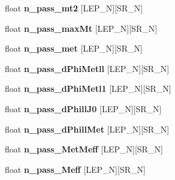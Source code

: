 \begin{DoxyCompactItemize}
\item 
\hypertarget{classSusySelection_a400a58bfcd54229a33eb69550d9debf9}{
float {\bfseries n\_\-pass\_\-mt2} \mbox{[}LEP\_\-N\mbox{]}\mbox{[}SR\_\-N\mbox{]}}
\label{classSusySelection_a400a58bfcd54229a33eb69550d9debf9}

\item 
\hypertarget{classSusySelection_a6504208015648870d347835d5add6fb4}{
float {\bfseries n\_\-pass\_\-maxMt} \mbox{[}LEP\_\-N\mbox{]}\mbox{[}SR\_\-N\mbox{]}}
\label{classSusySelection_a6504208015648870d347835d5add6fb4}

\item 
\hypertarget{classSusySelection_af8f3dc927ff7f296d4abfcc2016b217b}{
float {\bfseries n\_\-pass\_\-met} \mbox{[}LEP\_\-N\mbox{]}\mbox{[}SR\_\-N\mbox{]}}
\label{classSusySelection_af8f3dc927ff7f296d4abfcc2016b217b}

\item 
\hypertarget{classSusySelection_a4412ba67d89cdf7b6bf6602a34954bdb}{
float {\bfseries n\_\-pass\_\-dPhiMetll} \mbox{[}LEP\_\-N\mbox{]}\mbox{[}SR\_\-N\mbox{]}}
\label{classSusySelection_a4412ba67d89cdf7b6bf6602a34954bdb}

\item 
\hypertarget{classSusySelection_afa453d5b782b99bf096735218c96f830}{
float {\bfseries n\_\-pass\_\-dPhiMetl1} \mbox{[}LEP\_\-N\mbox{]}\mbox{[}SR\_\-N\mbox{]}}
\label{classSusySelection_afa453d5b782b99bf096735218c96f830}

\item 
\hypertarget{classSusySelection_a4c1e14157ae7a7dae1cffa41583e3ff0}{
float {\bfseries n\_\-pass\_\-dPhillJ0} \mbox{[}LEP\_\-N\mbox{]}\mbox{[}SR\_\-N\mbox{]}}
\label{classSusySelection_a4c1e14157ae7a7dae1cffa41583e3ff0}

\item 
\hypertarget{classSusySelection_a23f8087565d88b646da3e467db0eabac}{
float {\bfseries n\_\-pass\_\-dPhillMet} \mbox{[}LEP\_\-N\mbox{]}\mbox{[}SR\_\-N\mbox{]}}
\label{classSusySelection_a23f8087565d88b646da3e467db0eabac}

\item 
\hypertarget{classSusySelection_a221aa8341faf3f686d93aa4c918a4dd0}{
float {\bfseries n\_\-pass\_\-MetMeff} \mbox{[}LEP\_\-N\mbox{]}\mbox{[}SR\_\-N\mbox{]}}
\label{classSusySelection_a221aa8341faf3f686d93aa4c918a4dd0}

\item 
\hypertarget{classSusySelection_a2765ca40e90e423501874acb2eae27fd}{
float {\bfseries n\_\-pass\_\-Meff} \mbox{[}LEP\_\-N\mbox{]}\mbox{[}SR\_\-N\mbox{]}}
\label{classSusySelection_a2765ca40e90e423501874acb2eae27fd}


\end{DoxyCompactItemize}

